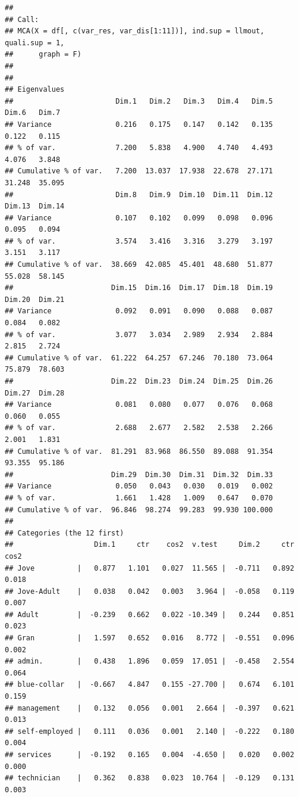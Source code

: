 \documentclass[
]{article}
\begin{document}
\begin{verbatim}
## 
## Call:
## MCA(X = df[, c(var_res, var_dis[1:11])], ind.sup = llmout, quali.sup = 1,  
##      graph = F) 
## 
## 
## Eigenvalues
##                        Dim.1   Dim.2   Dim.3   Dim.4   Dim.5   Dim.6   Dim.7
## Variance               0.216   0.175   0.147   0.142   0.135   0.122   0.115
## % of var.              7.200   5.838   4.900   4.740   4.493   4.076   3.848
## Cumulative % of var.   7.200  13.037  17.938  22.678  27.171  31.248  35.095
##                        Dim.8   Dim.9  Dim.10  Dim.11  Dim.12  Dim.13  Dim.14
## Variance               0.107   0.102   0.099   0.098   0.096   0.095   0.094
## % of var.              3.574   3.416   3.316   3.279   3.197   3.151   3.117
## Cumulative % of var.  38.669  42.085  45.401  48.680  51.877  55.028  58.145
##                       Dim.15  Dim.16  Dim.17  Dim.18  Dim.19  Dim.20  Dim.21
## Variance               0.092   0.091   0.090   0.088   0.087   0.084   0.082
## % of var.              3.077   3.034   2.989   2.934   2.884   2.815   2.724
## Cumulative % of var.  61.222  64.257  67.246  70.180  73.064  75.879  78.603
##                       Dim.22  Dim.23  Dim.24  Dim.25  Dim.26  Dim.27  Dim.28
## Variance               0.081   0.080   0.077   0.076   0.068   0.060   0.055
## % of var.              2.688   2.677   2.582   2.538   2.266   2.001   1.831
## Cumulative % of var.  81.291  83.968  86.550  89.088  91.354  93.355  95.186
##                       Dim.29  Dim.30  Dim.31  Dim.32  Dim.33
## Variance               0.050   0.043   0.030   0.019   0.002
## % of var.              1.661   1.428   1.009   0.647   0.070
## Cumulative % of var.  96.846  98.274  99.283  99.930 100.000
## 
## Categories (the 12 first)
##                   Dim.1     ctr    cos2  v.test     Dim.2     ctr    cos2
## Jove          |   0.877   1.101   0.027  11.565 |  -0.711   0.892   0.018
## Jove-Adult    |   0.038   0.042   0.003   3.964 |  -0.058   0.119   0.007
## Adult         |  -0.239   0.662   0.022 -10.349 |   0.244   0.851   0.023
## Gran          |   1.597   0.652   0.016   8.772 |  -0.551   0.096   0.002
## admin.        |   0.438   1.896   0.059  17.051 |  -0.458   2.554   0.064
## blue-collar   |  -0.667   4.847   0.155 -27.700 |   0.674   6.101   0.159
## management    |   0.132   0.056   0.001   2.664 |  -0.397   0.621   0.013
## self-employed |   0.111   0.036   0.001   2.140 |  -0.222   0.180   0.004
## services      |  -0.192   0.165   0.004  -4.650 |   0.020   0.002   0.000
## technician    |   0.362   0.838   0.023  10.764 |  -0.129   0.131   0.003

\end{verbatim}
\end{document}
